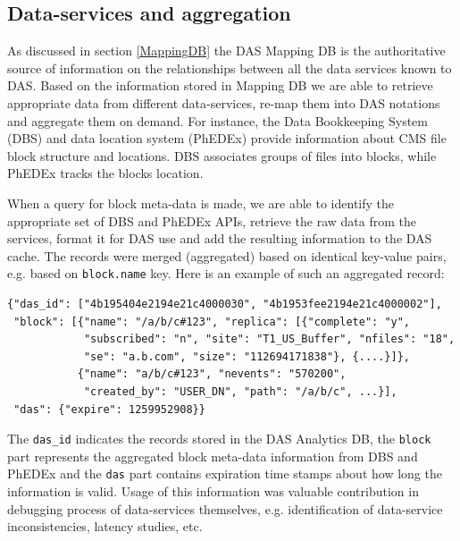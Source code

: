 \documentclass[1p,times]{elsarticle}
\begin{document}
\subsection{Data-services and aggregation}
As discussed in section \ref{MappingDB} the DAS Mapping DB 
is the authoritative source of information on the relationships between 
all the data services known to DAS.
Based on the information stored in Mapping DB we are able to 
retrieve appropriate data from different data-services, re-map them into 
DAS notations and aggregate them on demand. For instance, the Data 
Bookkeeping System (DBS) \cite{DBS} and data location system (PhEDEx) \cite{PhEDEx}
provide information about CMS file block structure and locations.
DBS associates groups of files into blocks, while PhEDEx tracks the blocks
location. 

When a query for block meta-data is made, we are
able to identify the appropriate set of 
DBS and PhEDEx APIs, retrieve the raw data from the services, format it
for DAS use and add the resulting information to the DAS cache. The records
were merged (aggregated) based on identical key-value pairs, e.g.
based on \verb+block.name+ key. Here is an example of such an aggregated record:
\begin{verbatim}
{"das_id": ["4b195404e2194e21c4000030", "4b1953fee2194e21c4000002"], 
 "block": [{"name": "/a/b/c#123", "replica": [{"complete": "y", 
            "subscribed": "n", "site": "T1_US_Buffer", "nfiles": "18", 
            "se": "a.b.com", "size": "112694171838"}, {....}]},
           {"name": "a/b/c#123", "nevents": "570200", 
            "created_by": "USER_DN", "path": "/a/b/c", ...}],
 "das": {"expire": 1259952908}}
\end{verbatim}
The \verb+das_id+ indicates the records stored in the DAS Analytics DB,
the \verb+block+ part represents the aggregated block meta-data information from DBS
and PhEDEx and the \verb+das+ part contains expiration time stamps
about how long the information is valid.
Usage of this information was valuable contribution in debugging process of
data-services themselves, e.g. identification of data-service inconsistencies, 
latency studies, etc.
\end{document}
